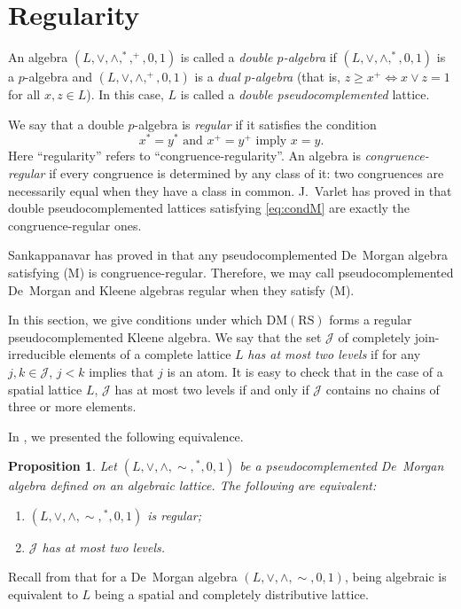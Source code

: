 \documentclass[11pt,a4paper]{amsart}
\theoremstyle{plain}
\newtheorem{proposition}[theorem]{Proposition}
\theoremstyle{definition}
\theoremstyle{remark}
\numberwithin{equation}{section}
\begin{document}
\section{Regularity} \label{sec:regular}

An algebra $(L,\vee,\wedge,^*,^{+},0,1)$ is called a \emph{double $p$-algebra} 
if $(L,\vee,\wedge,^*,0,1)$ is a $p$-algebra and $(L,\vee,\wedge,^{+},0,1)$ is a 
\emph{dual $p$-algebra} (that is, $z\geq
x^{+} \iff x\vee z=1$ for all $x,z \in L$). In this case, 
$L$ is called a \emph{double pseudocomplemented} lattice. 

We say that a double $p$-algebra is \emph{regular} if it satisfies the 
condition
\begin{equation} \label{eq:condM} \tag{M}
x^* = y^* \text{ and } x^+ = y^+ \text{ imply } x = y. 
\end{equation}
Here ``regularity'' refers to ``congruence-regularity''. 
An algebra is \emph{congruence-regular} if every congruence is determined 
by any class of it: two congruences are necessarily equal when they
have a  class in common. J.~Varlet has proved in \cite{Var72} that
double  pseudocomplemented lattices satisfying \eqref{eq:condM} are
exactly the congruence-regular ones.

Sankappanavar has proved in \cite{Sankappanavar86} that any 
pseudocomplemented De~Morgan algebra satisfying (M) is congruence-regular. 
Therefore, we may call pseudocomplemented
De~Morgan and Kleene algebras regular when they satisfy (M).  

In this section, we give conditions under which 
$\mathrm{DM(RS)}$ forms a regular pseudocomplemented Kleene algebra.
We say that the set $\mathcal{J}$ of completely join-irreducible 
elements of a complete lattice $L$ \emph{has at most two levels} 
if for any  $j,k \in \mathcal{J}$, $j<k$ implies that $j$
is an atom. It is easy to check that in the case of a spatial 
lattice $L$, $\mathcal{J}$ has at most two levels if and only if 
$\mathcal{J}$ contains no chains of three or more elements. 

In  \cite[Proposition 4.4]{JarRad18}, we presented the following
equivalence. 

\begin{proposition} \label{prop:at_most_two}
Let $(L,\vee,\wedge,{\sim},{^*},0,1)$ be a
pseudocomplemented De~Morgan algebra defined on an algebraic lattice. The
following are equivalent:
\begin{enumerate}[label={\rm (\roman*)}]
\item  $(L,\vee,\wedge,{\sim},{^*},0,1)$ is regular;
\item $\mathcal{J}$ has at most two levels.
\end{enumerate}    
\end{proposition}
\noindent%
Recall from \cite[Theorem~{10.29}]{Davey02} that for a De~Morgan algebra $(L,\vee,\wedge,{\sim},0,1)$,
being algebraic is equivalent to $L$ being a spatial and completely distributive lattice.
\end{document}
